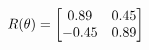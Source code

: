 \documentclass[preview]{standalone}
\begin{document}
\begin{align*}
\special{dvisvgm:raw <g id='unique000'>}R(\theta) = \begin{bmatrix}0.89 & 0.45\\-0.45 & 0.89\end{bmatrix}\special{dvisvgm:raw </g>}
\end{align*}
\end{document}
